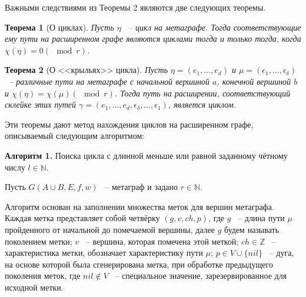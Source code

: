 \documentclass[14pt]{mmcs-article}
\newtheorem{theorem}{Теорема}
\begin{document}
Важными следствиями из Теоремы 2 являются две следующих теоремы.

\begin{theorem}[О циклах]

Пусть $\eta$ ~-- цикл на метаграфе. Тогда соответствующие ему пути на расширенном графе являются циклами тогда и только тогда, когда $\chi(\eta) = 0 (\mod{r})$.

\end{theorem}

\begin{theorem}[О <<крыльях>> цикла]

Пусть $\eta = (e_1, ..., e_d)$ и $\mu = (\epsilon_1, ..., \epsilon_{\delta})$ ~-- различные пути на метаграфе с начальной вершиной $a$, конечной вершиной $b$ и $\chi(\eta) = \chi(\mu) (\mod{r})$. Тогда путь на расширении, соответствующий склейке этих путей $\gamma = (e_1, \dots, e_d, \epsilon_{\delta}, \dots, \epsilon_1)$, является циклом.

\end{theorem}

Эти теоремы дают метод нахождения циклов на расширенном графе, описываемый следующим алгоритмом:


\textbf{Алгоритм 1.} Поиска цикла с длинной меньше или равной заданному чётному числу $l \in \mathbb{N}$.

Пусть $G(A \cup B, E, f, w)$ ~-- метаграф и задано $r \in \mathbb{N}$.

Алгоритм основан на заполнении множества меток для вершин метаграфа. Каждая метка представляет собой четвёрку $(g, v, ch, p)$, где $g$ ~-- длина пути $\mu$ пройденного от начальной до помечаемой вершины, далее $g$ будем называть поколением метки; $v$ ~-- вершина, которая помечена этой меткой; $ch \in \mathbb{Z}$ ~-- характеристика метки, обозначает характеристику пути $\mu$; $p \in V \cup \{ nil \}$ ~-- дуга, на основе которой была сгенерирована метка, при обработке предыдущего поколения меток, где $nil \not\in V $ ~-- специальное значение, зарезервированное для исходной метки.
\end{document}
